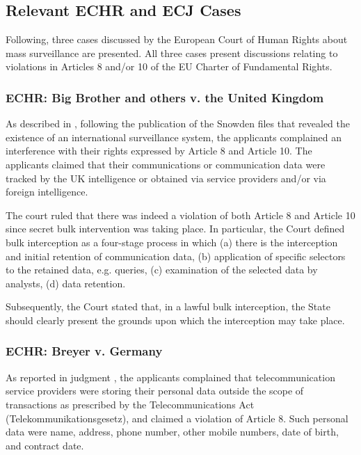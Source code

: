 \subsection{Relevant ECHR and ECJ Cases}

Following, three cases discussed by the European Court of Human Rights about mass surveillance are presented. All three cases present discussions relating to violations in Articles 8 and/or 10 of the EU Charter of Fundamental Rights.

\subsubsection{ECHR: Big Brother and others v. the United Kingdom}
\label{ss:big_brother}

As described in \cite{big_brother}, following the publication of the Snowden files that revealed the existence of an international surveillance system, the applicants complained an interference with their rights expressed by Article 8 and Article 10. The applicants claimed that their communications or communication data were tracked by the UK intelligence or obtained via service providers and/or via foreign intelligence.

The court ruled that there was indeed a violation of both Article 8 and Article 10 since secret bulk intervention was taking place. In particular, the Court defined bulk interception as a four-stage process in which (a) there is the interception and initial retention of communication data, (b) application of specific selectors to the retained data, e.g. queries, (c) examination of the selected data by analysts, (d) data retention. 

Subsequently, the Court stated that, in a lawful bulk interception, the State should clearly present the grounds upon which the interception may take place.

\subsubsection{ECHR: Breyer v. Germany}

As reported in judgment \cite{telecom}, the applicants complained that telecommunication service providers were storing their personal data outside the scope of transactions as prescribed by the Telecommunications Act (Telekommunikationsgesetz), and claimed a violation of Article 8. Such personal data were name, address, phone number, other mobile numbers, date of birth, and contract date.

